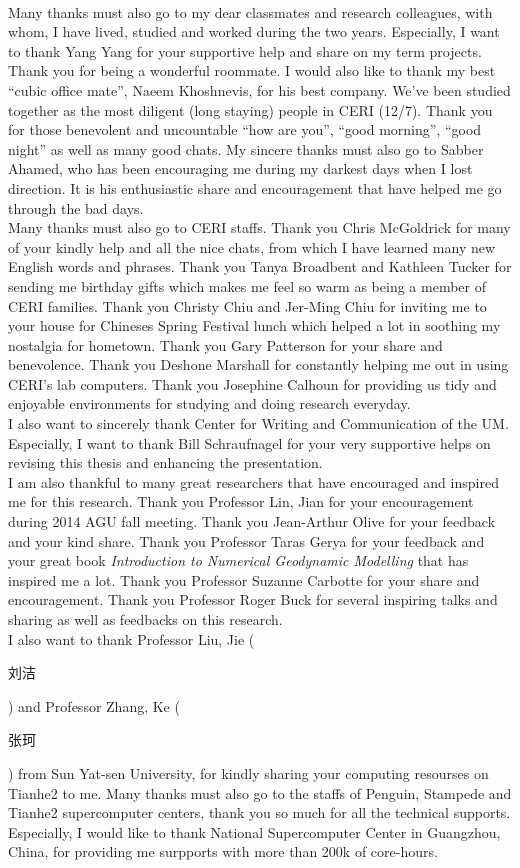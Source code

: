 \\
Many thanks must also go to my dear classmates and research colleagues, with whom, I have lived, studied and worked during the two years. Especially, I want to thank Yang Yang for your supportive help and share on my term projects. Thank you for being a wonderful roommate. I would also like to thank my best ``cubic office mate'', Naeem Khoshnevis, for his best company. We've been studied together as the most diligent (long staying) people in CERI (12/7). Thank you for those benevolent and uncountable ``how are you'', ``good morning'', ``good night'' as well as many good chats. My sincere thanks must also go to Sabber Ahamed, who has been encouraging me during my darkest days when I lost direction. It is his enthusiastic share and encouragement that have helped me go through the bad days. 
\\
Many thanks must also go to CERI staffs. Thank you Chris McGoldrick for many of your kindly help and all the nice chats, from which I have learned many new English words and phrases. Thank you Tanya Broadbent and Kathleen Tucker for sending me birthday gifts which makes me feel so warm as being a member of CERI families. Thank you Christy Chiu and Jer-Ming Chiu for inviting me to your house for Chineses Spring Festival lunch which helped a lot in soothing my nostalgia for hometown. Thank you Gary Patterson for your share and benevolence. Thank you Deshone Marshall for constantly helping me out in using CERI's lab computers. Thank you Josephine Calhoun for providing us tidy and enjoyable environments for studying and doing research everyday. 
\\
I also want to sincerely thank Center for Writing and Communication of the UM. Especially, I want to thank Bill Schraufnagel for your very supportive helps on revising this thesis and enhancing the presentation.
\\
I am also thankful to many great researchers that have encouraged and inspired me for this research. Thank you Professor Lin, Jian for your encouragement during 2014 AGU fall meeting. Thank you Jean-Arthur Olive for your feedback and your kind share. Thank you Professor Taras Gerya for your feedback and your great book \textit{Introduction to Numerical Geodynamic Modelling} that has inspired me a lot. Thank you Professor Suzanne Carbotte for your share and encouragement. Thank you Professor Roger Buck for several inspiring talks and sharing as well as feedbacks on this research.
\\
I also want to thank Professor Liu, Jie (\begin{CJK}{UTF8}{gbsn}刘洁\end{CJK}) and Professor Zhang, Ke (\begin{CJK}{UTF8}{gbsn}张珂\end{CJK}) from Sun Yat-sen University, for kindly sharing your computing resourses on Tianhe2 to me. Many thanks must also go to the staffs of Penguin, Stampede and Tianhe2 supercomputer centers, thank you so much for all the technical supports. Especially, I would like to thank National Supercomputer Center in Guangzhou, China, for providing me surpports with more than 200k of core-hours. 
